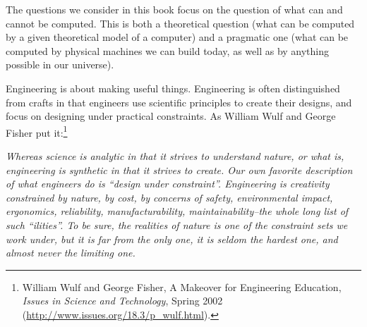 
The questions we consider in this book focus on the question of what can and cannot be computed.  This is both a theoretical question (what can be computed by a given theoretical model of a computer) and a pragmatic one (what can be computed by physical machines we can build today, as well as by anything possible in our universe).  

 Engineering is about making useful things.  Engineering is often distinguished from crafts in that engineers use scientific principles to create their designs, and focus on designing under practical constraints.  As William Wulf  and George Fisher  put it:\footnote{William Wulf and George Fisher, A Makeover for Engineering Education, \emph{Issues in Science and Technology}, Spring 2002 (\url{http://www.issues.org/18.3/p_wulf.html}).}
\begin{smallquote}
{\em Whereas science is analytic in that it strives to understand nature, or what is, engineering is synthetic in that it strives to create. Our own favorite description of what engineers do is ``design under constraint''. Engineering is creativity constrained by nature, by cost, by concerns of safety, environmental impact, ergonomics, reliability, manufacturability, maintainability--the whole long list of such ``ilities''. To be sure, the realities of nature is one of the constraint sets we work under, but it is far from the only one, it is seldom the hardest one, and almost never the limiting one.}
\end{smallquote}

